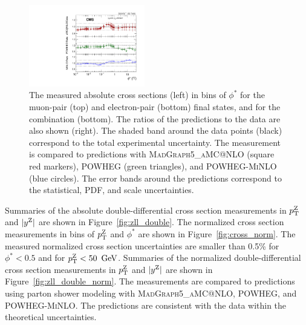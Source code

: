 \begin{figure}
	\includegraphics[width=0.45\textwidth]{figures/zpt/zll_phi_ratio.pdf}
	\caption{The measured absolute cross sections (left) in bins of $\phi^*$ for the muon-pair (top) and electron-pair (bottom) final states, and for the combination (bottom). The ratios of the predictions to the data are also shown (right). The shaded band around the data points (black) correspond to the total experimental uncertainty. The measurement is compared to predictions with \textsc{MadGraph5\_aMC@NLO} (square red markers), \textsc{POWHEG} (green triangles), and \textsc{POWHEG-MiNLO} (blue circles). The error bands around the predictions correspond to the statistical, PDF, and scale uncertainties.}
	\label{fig:unf_phi}
\end{figure}

Summaries of the absolute double-differential cross section measurements in 
$p_{\mathrm{T}}^{\mathrm{Z}}$ and $|y^{\mathrm{Z}}|$ are shown in Figure~\ref{fig:zll_double}. The normalized cross section measurements in bins of  $p_{\mathrm{T}}^{\mathrm{Z}}$ and  $\phi^*$ are shown in Figure~\ref{fig:cross_norm}. The measured normalized cross section  uncertainties are smaller than 0.5\% for $\phi^*<0.5$ and for $p_{\mathrm{T}}^{\mathrm{Z}}<50~\,\text{Ge\hspace{-.08em}V}$. Summaries of the normalized double-differential cross section measurements in $p_{\mathrm{T}}^{\mathrm{Z}}$ and $|y^{\mathrm{Z}}|$ are shown in Figure~\ref{fig:zll_double_norm}. The measurements are compared to predictions using parton shower modeling with \textsc{MadGraph5\_aMC@NLO}, \textsc{POWHEG}, and \textsc{POWHEG-MiNLO}. The predictions are consistent with the data within the theoretical uncertainties.     

